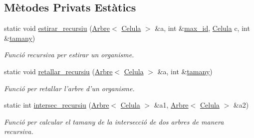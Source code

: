 \subsection*{Mètodes Privats Estàtics}
\begin{DoxyCompactItemize}
\item 
static void \hyperlink{class_organisme_a8dbc9127169717373507ddac7a9c7df9}{estirar\-\_\-recursiu} (\hyperlink{class_arbre}{Arbre}$<$ \hyperlink{struct_organisme_1_1_celula}{Celula} $>$ \&a, int \&\hyperlink{class_organisme_ae7f51a74f01cee155cf88a5b01545f78}{max\-\_\-id}, \hyperlink{struct_organisme_1_1_celula}{Celula} c, int \&\hyperlink{class_organisme_a5d30992b5ded1a9314aff94ce9fb3932}{tamany})
\begin{DoxyCompactList}\small\item\em Funció recursiva per estirar un organisme. \end{DoxyCompactList}\item 
static void \hyperlink{class_organisme_ae6b5820dd264a10c31c052e1870c4e8a}{retallar\-\_\-recursiu} (\hyperlink{class_arbre}{Arbre}$<$ \hyperlink{struct_organisme_1_1_celula}{Celula} $>$ \&a, int \&\hyperlink{class_organisme_a5d30992b5ded1a9314aff94ce9fb3932}{tamany})
\begin{DoxyCompactList}\small\item\em Funció per retallar l'arbre d'un organisme. \end{DoxyCompactList}\item 
static int \hyperlink{class_organisme_add0b533b80fa284326cef38f1de3420b}{intersec\-\_\-recursiu} (\hyperlink{class_arbre}{Arbre}$<$ \hyperlink{struct_organisme_1_1_celula}{Celula} $>$ \&a1, \hyperlink{class_arbre}{Arbre}$<$ \hyperlink{struct_organisme_1_1_celula}{Celula} $>$ \&a2)
\begin{DoxyCompactList}\small\item\em Funció per calcular el tamany de la intersecció de dos arbres de manera recursiva. \end{DoxyCompactList}\end{DoxyCompactItemize}
